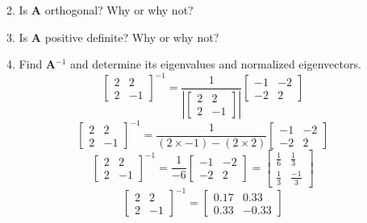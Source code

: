 \documentclass[12pt,a4paper]{paper}
\begin{document}
\begin{enumerate}
\begin{enumerate}
\begin{equation}
\end{equation}
\item Is \textbf{A} orthogonal? Why or why not?
\item Is \textbf{A} positive definite? Why or why not?
\item Find \textbf{A}$^{-1}$ and determine its eigenvalues and normalized eigenvectors.
\begin{equation}
\left[\begin{array}{cc}2 & 2 \\ 2 & -1\end{array}\right]^{-1} = \frac{1}{\left|\left[\begin{array}{cc}2 & 2 \\ 2 & -1\end{array}\right]\right|}\left[\begin{array}{cc}-1 & -2 \\ -2 & 2\end{array}\right]
\end{equation}
\begin{equation}
\left[\begin{array}{cc}2 & 2 \\ 2 & -1\end{array}\right]^{-1} = \frac{1}{\left(2 \times -1\right)-\left(2 \times 2\right)}\left[\begin{array}{cc}-1 & -2 \\ -2 & 2\end{array}\right]
\end{equation}
\begin{equation}
\left[\begin{array}{cc}2 & 2 \\ 2 & -1\end{array}\right]^{-1} = \frac{1}{-6}\left[\begin{array}{cc}-1 & -2 \\ -2 & 2\end{array}\right] = \left[\begin{array}{cc}\frac{1}{6} & \frac{1}{3} \\ \frac{1}{3} & \frac{-1}{3}\end{array}\right]
\end{equation}
\begin{equation}
\left[\begin{array}{cc}2 & 2 \\ 2 & -1\end{array}\right]^{-1} = \left[\begin{array}{cc}0.17 & 0.33 \\ 0.33 & -0.33\end{array}\right]

\end{equation}
\end{enumerate}
\end{enumerate}
\end{document}
